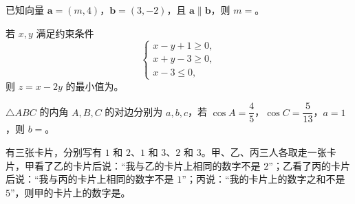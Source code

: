 \begin{question}
已知向量 $\boldsymbol a=(m,4)$，$\boldsymbol b=(3,-2)$，且 $\boldsymbol a\parallel\boldsymbol b$，则 $m=$\gkblank{}。

\end{question}
\begin{question}
若 $x,y$ 满足约束条件
\nopagebreak[4]
\[
\begin{cases}
x-y+1\geqslant0,\\
x+y-3\geqslant0,\\
x-3\leqslant0,
\end{cases}
\]
则 $z=x-2y$ 的最小值为\gkblank{}。

\end{question}
\begin{question}
$\triangle ABC$ 的内角 $A,B,C$ 的对边分别为 $a,b,c$，若 $\cos A=\dfrac45$，$\cos C=\dfrac5{13}$，$a=1$，则 $b=$\gkblank{}。

\end{question}
\begin{question}
有三张卡片，分别写有 $1$ 和 $2$、$1$ 和 $3$、$2$ 和 $3$。甲、乙、丙三人各取走一张卡片，甲看了乙的卡片后说：“我与乙的卡片上相同的数字不是 $2$”；乙看了丙的卡片后说：“我与丙的卡片上相同的数字不是 $1$”；丙说：“我的卡片上的数字之和不是 $5$”，则甲的卡片上的数字是\gkblank{}。

\end{question}

